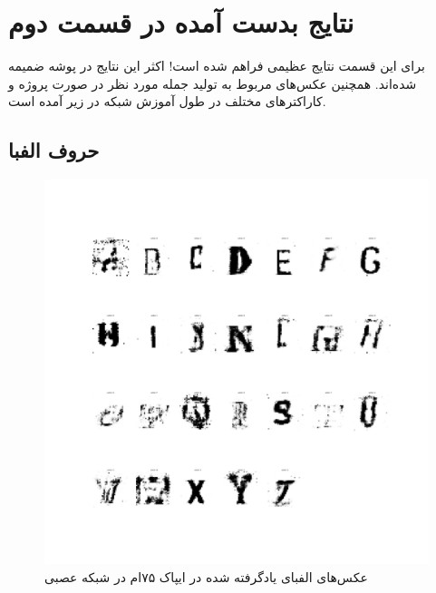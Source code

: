 \documentclass{article}
\begin{document}
\section{نتایج بدست آمده در قسمت دوم}
برای این قسمت نتایج عظیمی فراهم شده است! اکثر این نتایج در پوشه‌  ضمیمه شده‌اند. همچنین عکس‌های مربوط به تولید جمله مورد نظر در صورت پروژه و کاراکتر‌های مختلف در طول آموزش شبکه  در زیر آمده است.
\subsection{حروف الفبا}
\begin{figure}[H]
	\centerline{\includegraphics[width=\textwidth , height=\textheight ]{../results/CGAN_Adam/figs/Alphabet_(Epoch=75)}}
	\caption{عکس‌های الفبای یادگرفته شده در ایپاک ۷۵ام در شبکه عصبی}
\end{figure}
\end{document}
